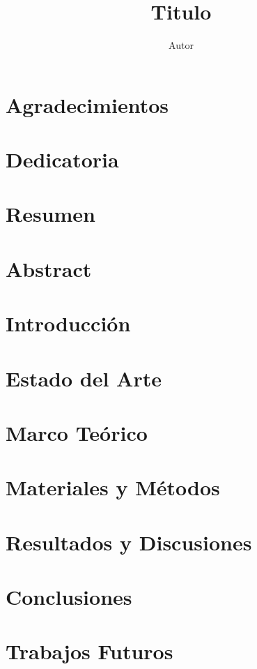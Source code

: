 \documentclass[12pt,a4paper]{report}
\author{Autor}
\title{Titulo}
\begin{document}

\chapter*{Agradecimientos}
\chapter*{Dedicatoria}
\tableofcontents
\listoffigures
\listoftables
\chapter*{Resumen}
\chapter*{Abstract}
\chapter{Introducción}


\chapter{Estado del Arte}


\chapter{Marco Teórico}


\chapter{Materiales y Métodos}


\chapter{Resultados y Discusiones}


\chapter{Conclusiones}


\chapter{Trabajos Futuros}


\printbibliography[heading=bibintoc,title={Bibliografia}]

\appendix
\chapter{}

\end{document}
